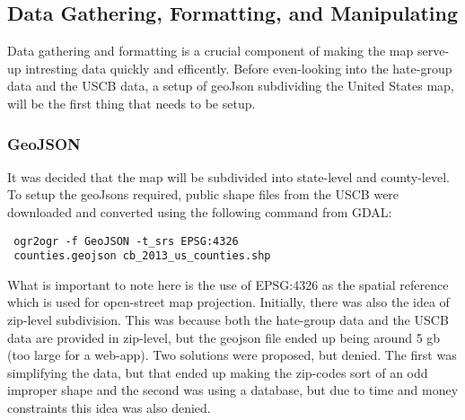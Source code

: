 \documentclass[twoside]{article}
\begin{document}
\begin{multicols}{2}
\subsection{Data Gathering, Formatting, and Manipulating}
Data gathering and formatting is a crucial component of making the map serve-up intresting data quickly and efficently.
Before even-looking into the hate-group data and the USCB data, a setup of geoJson subdividing the United States map, will be the first thing that needs to be setup. 

\subsubsection{GeoJSON}
It was decided that the map will be subdivided into state-level and county-level. To setup the geoJsons required, public shape files from the USCB were downloaded and converted using the following command from GDAL:

\begin{verbatim}
 ogr2ogr -f GeoJSON -t_srs EPSG:4326 
 counties.geojson cb_2013_us_counties.shp
\end{verbatim}
What is important to note here is the use of EPSG:4326 as the spatial reference which is used for open-street map projection.
Initially, there was also the idea of zip-level subdivision. This was because both the hate-group data and the USCB data are provided in zip-level, but the geojson file ended up being around 5 gb (too large for a web-app). Two solutions were proposed, but denied. The first was simplifying the data, but that ended up making the zip-codes sort of an odd improper shape and the second was using a database, but due to time and money constraints this idea was also denied. 


\end{multicols}
\end{document}
